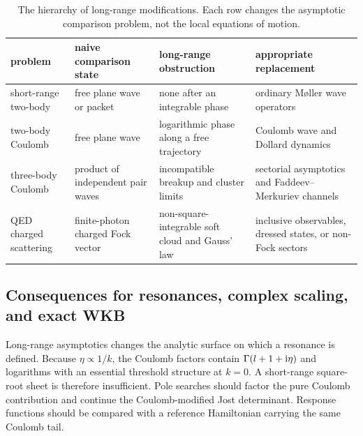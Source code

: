 \begin{table}[t]
  \centering
  \small
  \begin{tabular}{>{\raggedright\arraybackslash}p{}
                  >{\raggedright\arraybackslash}p{}
                  >{\raggedright\arraybackslash}p{}
                  >{\raggedright\arraybackslash}p{}}
    \toprule
    problem & naive comparison state & long-range obstruction &
    appropriate replacement \\
    \midrule
    short-range two-body &
    free plane wave or packet &
    none after an integrable phase &
    ordinary M{\o}ller wave operators \\
\addlinespace
    two-body Coulomb &
    free plane wave &
    logarithmic phase along a free trajectory &
    Coulomb wave and Dollard dynamics \\
\addlinespace
    three-body Coulomb &
    product of independent pair waves &
    incompatible breakup and cluster limits &
    sectorial asymptotics and Faddeev--Merkuriev channels \\
\addlinespace
    QED charged scattering &
    finite-photon charged Fock vector &
    non-square-integrable soft cloud and Gauss' law &
    inclusive observables, dressed states, or non-Fock sectors \\
    \bottomrule
  \end{tabular}
  \caption{The hierarchy of long-range modifications.  Each row changes the
  asymptotic comparison problem, not the local equations of motion.}
  \label{tab:long-range-hierarchy}
\end{table}

\subsection{Consequences for resonances, complex scaling, and exact WKB}
\label{subsec:long-range-resonances}

Long-range asymptotics changes the analytic surface on which a resonance is
defined.  Because $\eta\propto1/k$, the Coulomb factors contain
$\Gamma(l+1+\mathrm{i}\eta)$ and logarithms with an essential threshold structure
at $k=0$.  A short-range square-root sheet is therefore insufficient.  Pole
searches should factor the pure Coulomb contribution and continue the
Coulomb-modified Jost determinant.  Response functions should be compared
with a reference Hamiltonian carrying the same Coulomb tail.

